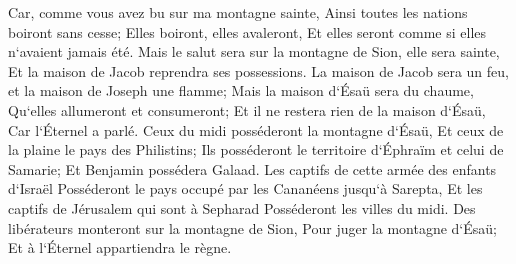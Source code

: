 \verse Car, comme vous avez bu sur ma montagne sainte, Ainsi toutes les nations boiront sans cesse; Elles boiront, elles avaleront, Et elles seront comme si elles n`avaient jamais été. 
\verse Mais le salut sera sur la montagne de Sion, elle sera sainte, Et la maison de Jacob reprendra ses possessions. 
\verse La maison de Jacob sera un feu, et la maison de Joseph une flamme; Mais la maison d`Ésaü sera du chaume, Qu`elles allumeront et consumeront; Et il ne restera rien de la maison d`Ésaü, Car l`Éternel a parlé. 
\verse Ceux du midi posséderont la montagne d`Ésaü, Et ceux de la plaine le pays des Philistins; Ils posséderont le territoire d`Éphraïm et celui de Samarie; Et Benjamin possédera Galaad. 
\verse Les captifs de cette armée des enfants d`Israël Posséderont le pays occupé par les Cananéens jusqu`à Sarepta, Et les captifs de Jérusalem qui sont à Sepharad Posséderont les villes du midi. 
\verse Des libérateurs monteront sur la montagne de Sion, Pour juger la montagne d`Ésaü; Et à l`Éternel appartiendra le règne. 
